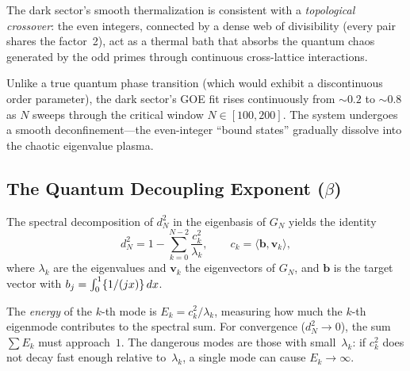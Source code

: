 \documentclass[11pt,a4paper]{article}
\begin{document}
\begin{principle}
The dark sector's smooth thermalization is consistent with a
\emph{topological crossover}: the even integers, connected by a dense
web of divisibility (every pair shares the factor~2), act as a thermal
bath that absorbs the quantum chaos generated by the odd primes through
continuous cross-lattice interactions.

Unlike a true quantum phase transition (which would exhibit a
discontinuous order parameter), the dark sector's GOE fit rises
continuously from $\sim 0.2$ to $\sim 0.8$ as $N$ sweeps through the
critical window $N \in [100, 200]$. The system undergoes a smooth
deconfinement---the even-integer ``bound states'' gradually dissolve
into the chaotic eigenvalue plasma.
\end{principle}

\subsection{The Quantum Decoupling Exponent ($\beta$)}
\label{sec:decoupling}

The spectral decomposition of $d_N^2$ in the eigenbasis of $G_N$
yields the identity
\[
  d_N^2 = 1 - \sum_{k=0}^{N-2} \frac{c_k^2}{\lambda_k},
  \qquad c_k = \langle \mathbf{b}, \mathbf{v}_k \rangle,
\]
where $\lambda_k$ are the eigenvalues and $\mathbf{v}_k$ the eigenvectors
of $G_N$, and $\mathbf{b}$ is the target vector with
$b_j = \int_0^1 \{1/(jx)\}\,dx$.

The \emph{energy} of the $k$-th mode is $E_k = c_k^2/\lambda_k$,
measuring how much the $k$-th eigenmode contributes to the spectral sum.
For convergence ($d_N^2 \to 0$), the sum $\sum E_k$ must approach~$1$.
The dangerous modes are those with small~$\lambda_k$: if $c_k^2$ does
not decay fast enough relative to~$\lambda_k$, a single mode can cause
$E_k \to \infty$.
\end{document}
